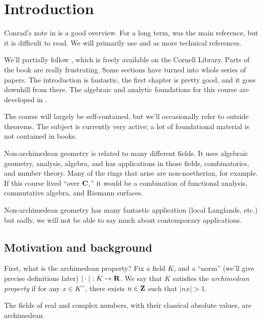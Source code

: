 




\section{Introduction}

Conrad's note in \cite{aws-2008} is a good overview. For a long term, 
\cite{bgr-1984} was the main reference, but it is difficult to read. We will 
primarily use \cite{berkovich-1990} and \cite{bosch-2014} as more technical 
references. 

We'll partially follow \cite{berkovich-1990}, which is freely available on 
the Cornell Library. Parts of the book are really frustrating. Some sections 
have turned into whole series of papers. The introduction is fantastic, the 
first chapter is pretty good, and it goes downhill from there. The algebraic 
and analytic foundations for this course are developed in \cite{bgr-1984}. 

The course will largely be self-contained, but we'll occasionally refer to 
outside theorems. The subject is currently very active; a lot of foundational 
material is not contained in books. 

Non-archimedean geometry is related to many different fields. It uses 
algebraic geometry, analysis, algebra, and has applications in those fields, 
combinatorics, and number theory. Many of the rings that arise are 
non-noetherian, for example. If this course lived ``over $\mathbf{C}$,'' it would 
be a combination of functional analysis, commutative algebra, and Riemann 
surfaces. 

Non-archimedean geometry has many fantastic application (local Langlands, etc.) 
but sadly, we will not be able to say much about contemporary applications. 





\subsection{Motivation and background}

First, what is the archimedean property? Fix a field $K$, and a ``norm'' 
(we'll give precise definitions later) $|\cdot|:K\to \mathbf{R}$. We say that $K$ 
satisfies the \emph{archimedean property} if for any $x\in K^\times$, there 
exists $n\in \mathbf{Z}$ such that $|n x|>1$. 

\begin{example}
The fields of real and complex numbers, with their classical absolute 
values, are archimedean.
\end{example}

